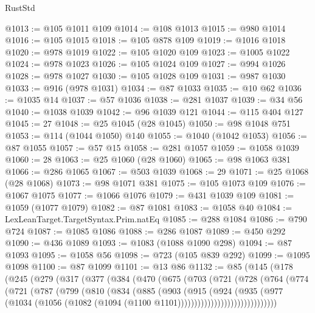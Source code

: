 \begin{lexlean}{RustStd}
\begin{coremodule}
@1013 := @105 @1011 @109
@1014 := @108 @1013
@1015 := @980 @1014
@1016 := @105 @1015
@1018 := @105 @878 @109
@1019 := @1016 @1018
@1020 := @978 @1019
@1022 := @105 @1020 @109
@1023 := @1005 @1022
@1024 := @978 @1023
@1026 := @105 @1024 @109
@1027 := @994 @1026
@1028 := @978 @1027
@1030 := @105 @1028 @109
@1031 := @987 @1030
@1033 := @916 (@978 @1031)
@1034 := @87 @1033
@1035 := @10 @62
@1036 := @1035 @14
@1037 := @57 @1036
@1038 := @281 @1037
@1039 := @34 @56
@1040 := @1038 @1039
@1042 := @96 @1039 @121
@1044 := @115 @404 @127
@1045 := 27
@1048 := @25 @1045 (@28 @1045)
@1050 := @98 @1048 @751
@1053 := @114 (@1044 @1050) @140
@1055 := @1040 (@1042 @1053)
@1056 := @87 @1055
@1057 := @57 @15
@1058 := @281 @1057
@1059 := @1058 @1039
@1060 := 28
@1063 := @25 @1060 (@28 @1060)
@1065 := @98 @1063 @381
@1066 := @286 @1065
@1067 := @503 @1039
@1068 := 29
@1071 := @25 @1068 (@28 @1068)
@1073 := @98 @1071 @381
@1075 := @105 @1073 @109
@1076 := @1067 @1075
@1077 := @1066 @1076
@1079 := @431 @1039 @109
@1081 := @1059 (@1077 @1079)
@1082 := @87 @1081
@1083 := @1058 @40
@1084 := LexLeanTarget.TargetSyntax.Prim.natEq
@1085 := @288 @1084
@1086 := @790 @724
@1087 := @1085 @1086
@1088 := @286 @1087
@1089 := @450 @292
@1090 := @436 @1089
@1093 := @1083 (@1088 @1090 @298)
@1094 := @87 @1093
@1095 := @1058 @56
@1098 := @723 (@105 @839 @292)
@1099 := @1095 @1098
@1100 := @87 @1099
@1101 := @13 @86
@1132 := @85
    (@145
      (@178
        (@245
          (@279
            (@317
              (@377
                (@384
                  (@470
                    (@675
                      (@703
                        (@721
                          (@728
                            (@764
                              (@774
                                (@721
                                  (@787
                                    (@799
                                      (@810
                                        (@834
                                          (@885
                                            (@903
                                              (@915
                                                (@924
                                                  (@935
                                                    (@977
                                                      (@1034
                                                        (@1056
                                                          (@1082
                                                            (@1094
                                                              (@1100
                                                                @1101))))))))))))))))))))))))))))))

\end{coremodule}
\end{lexlean}
